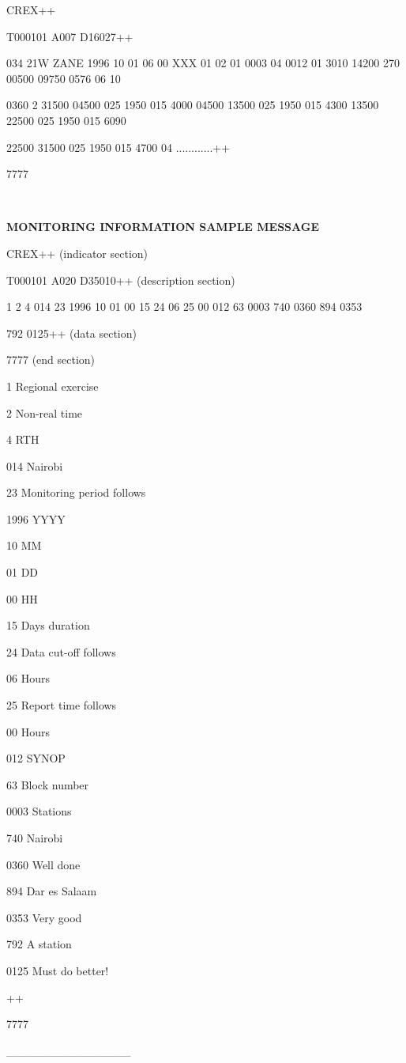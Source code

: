 CREX++

T000101 A007 D16027++

034 21W ZANE 1996 10 01 06 00 XXX 01 02 01 0003 04 0012 01 3010 14200 270 00500 09750 0576 06 10

0360 2 31500 04500 025 1950 015 4000 04500 13500 025 1950 015 4300 13500 22500 025 1950 015 6090

22500 31500 025 1950 015 4700 04 ............++

7777

\textbf{\\
}

\textbf{MONITORING INFORMATION SAMPLE MESSAGE}

CREX++ (indicator section)

T000101 A020 D35010++ (description section)

1 2 4 014 23 1996 10 01 00 15 24 06 25 00 012 63 0003 740 0360 894 0353

792 0125++ (data section)

7777 (end section)

1 Regional exercise

2 Non-real time

4 RTH

014 Nairobi

23 Monitoring period follows

1996 YYYY

10 MM

01 DD

00 HH

15 Days duration

24 Data cut-off follows

06 Hours

25 Report time follows

00 Hours

012 SYNOP

63 Block number

0003 Stations

740 Nairobi

0360 Well done

894 Dar es Salaam

0353 Very good

792 A station

0125 Must do better!

++

7777

\_\_\_\_\_\_\_\_\_\_\_\_\_\_\_
